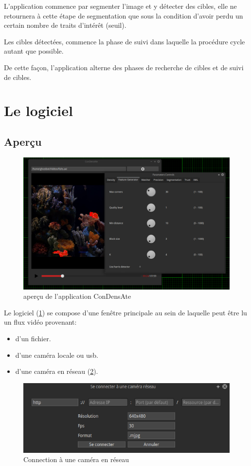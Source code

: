 \documentclass[a4paper,11pt]{report}
\begin{document}
L'application commence par segmenter l'image et y détecter des cibles, elle ne retournera à cette étape de segmentation que sous la condition d'avoir perdu un certain nombre de traits d'intérêt (seuil). 

Les cibles détectées, commence la phase de suivi dans laquelle la procédure cycle autant que possible.

De cette façon, l'application alterne des phases de recherche de cibles et de suivi de cibles.\\
 

\section{Le logiciel}

\subsection{Aperçu}
\begin{figure}[hbtp]
\centering
\includegraphics[scale=0.18]{screenshots/condensate3Cut.png}
\caption{aperçu de l'application ConDensAte}
\label{fig:aperçu}
\end{figure}

Le logiciel (\ref{fig:aperçu}) se compose d'une fenêtre principale au sein de laquelle peut être lu un flux vidéo provenant:
\begin{itemize}
\item d'un fichier.
\item d'une caméra locale ou usb.
\item d'une caméra en réseau (\ref{fig:camera}).
\end{itemize}

\begin{figure}[hbtp]
\centering
\includegraphics[scale=0.3]{screenshots/condensate4.png}
\caption{Connection à une caméra en réseau}
\label{fig:camera}
\end{figure}
\end{document}
